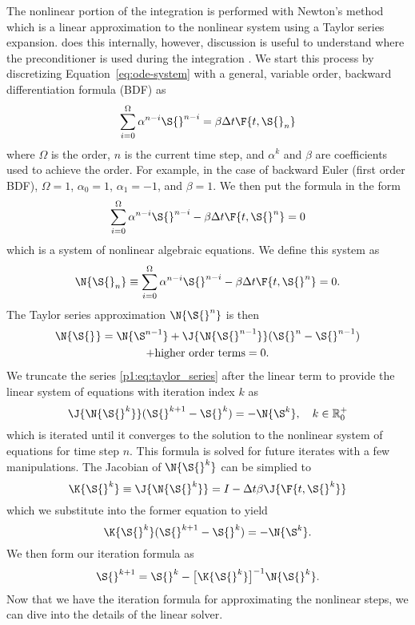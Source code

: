 The nonlinear portion of the integration is performed with Newton's method
which is a linear approximation to the nonlinear system using
a Taylor series expansion.
\sundials{} does this internally, however, discussion is useful to understand where the preconditioner is used during the integration \cite{hindmarsh_sundials_2005}.
We start this process by discretizing Equation~\eqref{eq:ode-system} with a general, variable order, backward differentiation formula (BDF) as
\begin{equation}
    \sum^{\Omega}_{i=0}{\alpha^{n-i} \S{}^{n-i}} = \beta \Delta t\F{t, \S{}_{n}}
\end{equation}
where $\Omega$ is the order, $n$ is the current time step, and
$\alpha^{k}$ and $\beta$ are coefficients used to achieve the order.
For example, in the case of backward Euler (first order BDF), $\Omega = 1$, $\alpha_0
= 1$, $\alpha_1 = -1$, and $\beta = 1$.
We then put the formula in the form
\begin{equation}
    \sum^{\Omega}_{i=0}{\alpha^{n-i} \S{}^{n-i}} - \beta \Delta t\F{t, \S{}^{n}} = 0
\end{equation}
which is a system of nonlinear algebraic equations.
We define this system as
\begin{equation}
    \N{\S{}_n} \equiv \sum^{\Omega}_{i=0}{\alpha^{n-i} \S{}^{n-i}} - \beta \Delta t\F{t, \S{}^{n}} = 0.
\end{equation}
The Taylor series approximation $\N{\S{}^{n}}$ is then
\begin{multline}
    \label{p1:eq:taylor_series}
    \N{\S{}^{}} = \N{\S^{n-1}} + \J{\N{\S{}^{n-1}}}(\S{}^{n}-\S{}^{n-1}) \\ + \text{higher order terms} = 0.
\end{multline}
We truncate the series \eqref{p1:eq:taylor_series} after the linear term
to provide the linear system of equations with iteration index $k$ as
\begin{equation}
     \J{\N{\S{}^{k}}}(\S{}^{k+1}-\S{}^{k}) = -\N{\S^{k}},\quad k\in\mathbb{R}^{+}_{0}
\end{equation}
which is iterated until it converges to the solution to the nonlinear system of
equations for time step $n$.
This formula is solved for future iterates with a few manipulations.
The Jacobian of $\N{\S{}^{k}}$ can be simplied to
\begin{equation}
    \K{\S{}^{k}} \equiv \J{\N{\S{}^{k}}} = I-\Delta t \beta\J{\F{t,\S{}^{k}}}
\end{equation}
which we substitute into the former equation to yield
\begin{equation}
    \K{\S{}^{k}}(\S{}^{k+1}-\S{}^{k}) = -\N{\S^{k}}.
\end{equation}
We then form our iteration formula as
\begin{equation}
    \label{eq:newIterForm}
    \S{}^{k+1} = \S{}^{k}-\big[\K{\S{}^{k}}\big]^{-1}\N{\S{}^{k}}.
\end{equation}
Now that we have the iteration formula for approximating the nonlinear steps, we can dive into the details of the linear solver.

